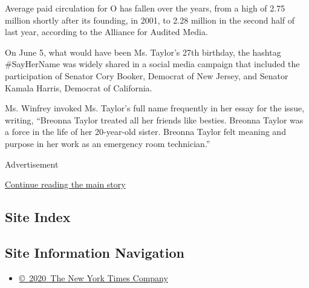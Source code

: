 Average paid circulation for O has fallen over the years, from a high of
2.75 million shortly after its founding, in 2001, to 2.28 million in the
second half of last year, according to the Alliance for Audited Media.

On June 5, what would have been Ms. Taylor's 27th birthday, the hashtag
\#SayHerName was widely shared in a social media campaign that included
the participation of Senator Cory Booker, Democrat of New Jersey, and
Senator Kamala Harris, Democrat of California.

Ms. Winfrey invoked Ms. Taylor's full name frequently in her essay for
the issue, writing, ``Breonna Taylor treated all her friends like
besties. Breonna Taylor was a force in the life of her 20-year-old
sister. Breonna Taylor felt meaning and purpose in her work as an
emergency room technician.''

Advertisement

\protect\hyperlink{after-bottom}{Continue reading the main story}

\hypertarget{site-index}{%
\subsection{Site Index}\label{site-index}}

\hypertarget{site-information-navigation}{%
\subsection{Site Information
Navigation}\label{site-information-navigation}}

\begin{itemize}
\tightlist
\item
  \href{https://help.nytimes3xbfgragh.onion/hc/en-us/articles/115014792127-Copyright-notice}{©~2020~The
  New York Times Company}
\end{itemize}

